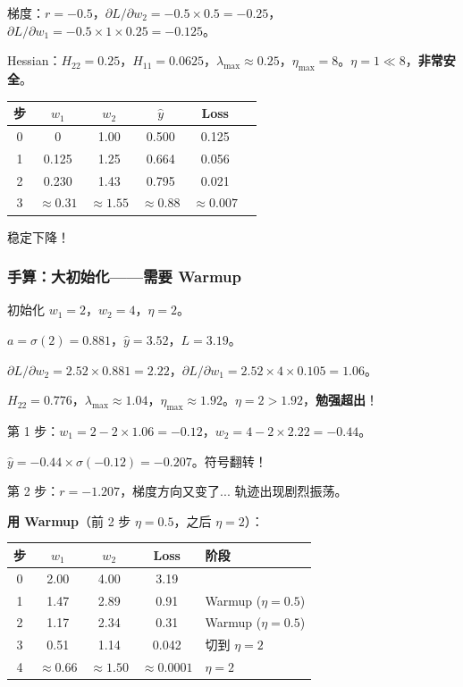 \documentclass[12pt, a4paper]{ctexart}
\begin{document}
梯度：$r = -0.5$，$\partial L/\partial w_2 = -0.5 \times 0.5 = -0.25$，$\partial L/\partial w_1 = -0.5 \times 1 \times 0.25 = -0.125$。

Hessian：$H_{22} = 0.25$，$H_{11} = 0.0625$，$\lambda_{\max} \approx 0.25$，$\eta_{\max} = 8$。$\eta = 1 \ll 8$，\textbf{非常安全}。

\begin{center}
\begin{tabular}{c|cc|cc|c}
步 & $w_1$ & $w_2$ & $\hat{y}$ & Loss \\
\hline
0 & 0 & 1.00 & 0.500 & 0.125 \\
1 & 0.125 & 1.25 & 0.664 & 0.056 \\
2 & 0.230 & 1.43 & 0.795 & 0.021 \\
3 & $\approx 0.31$ & $\approx 1.55$ & $\approx 0.88$ & $\approx 0.007$ \\
\end{tabular}
\end{center}

稳定下降！

\subsubsection{手算：大初始化——需要 Warmup}

初始化 $w_1 = 2$，$w_2 = 4$，$\eta = 2$。

$a = \sigma(2) = 0.881$，$\hat{y} = 3.52$，$L = 3.19$。

$\partial L/\partial w_2 = 2.52 \times 0.881 = 2.22$，$\partial L/\partial w_1 = 2.52 \times 4 \times 0.105 = 1.06$。

$H_{22} = 0.776$，$\lambda_{\max} \approx 1.04$，$\eta_{\max} \approx 1.92$。$\eta = 2 > 1.92$，\textbf{勉强超出}！

第 1 步：$w_1 = 2 - 2\times 1.06 = -0.12$，$w_2 = 4 - 2\times 2.22 = -0.44$。

$\hat{y} = -0.44 \times \sigma(-0.12) = -0.207$。符号翻转！

第 2 步：$r = -1.207$，梯度方向又变了... 轨迹出现剧烈振荡。

\textbf{用 Warmup}（前 2 步 $\eta = 0.5$，之后 $\eta = 2$）：

\begin{center}
\begin{tabular}{c|cc|c|l}
步 & $w_1$ & $w_2$ & Loss & 阶段 \\
\hline
0 & 2.00 & 4.00 & 3.19 & \\
1 & 1.47 & 2.89 & 0.91 & Warmup ($\eta=0.5$) \\
2 & 1.17 & 2.34 & 0.31 & Warmup ($\eta=0.5$) \\
3 & 0.51 & 1.14 & 0.042 & 切到 $\eta=2$ \\
4 & $\approx 0.66$ & $\approx 1.50$ & $\approx 0.0001$ & $\eta=2$ \\
\end{tabular}
\end{center}
\end{document}
